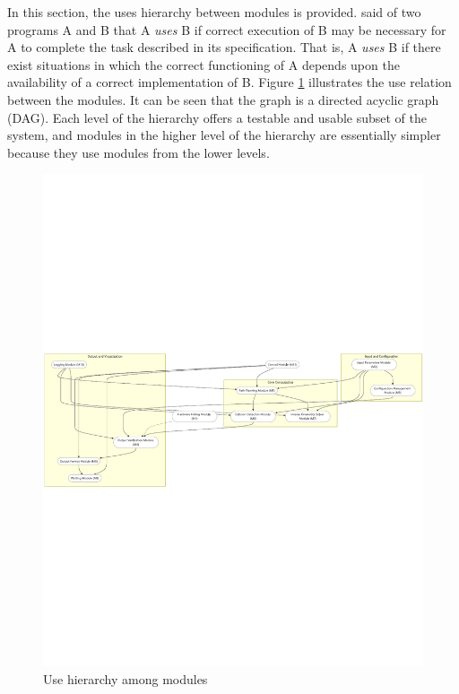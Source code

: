 \documentclass[12pt, titlepage]{article}
\begin{document}
In this section, the uses hierarchy between modules is
provided. \citet{Parnas1978} said of two programs A and B that A {\em uses} B if
correct execution of B may be necessary for A to complete the task described in
its specification. That is, A {\em uses} B if there exist situations in which
the correct functioning of A depends upon the availability of a correct
implementation of B.  Figure \ref{FigUH} illustrates the use relation between
the modules. It can be seen that the graph is a directed acyclic graph
(DAG). Each level of the hierarchy offers a testable and usable subset of the
system, and modules in the higher level of the hierarchy are essentially simpler
because they use modules from the lower levels.


\begin{figure}[H]
\centering
\includegraphics[width=1\textwidth]{figure2.pdf}
\caption{Use hierarchy among modules}
\label{FigUH}
\end{figure}

\end{document}
